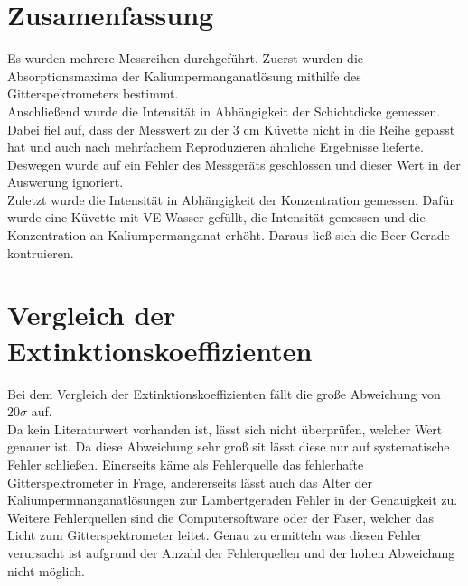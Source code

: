 
\section{Zusamenfassung}

Es wurden mehrere Messreihen durchgeführt. Zuerst wurden die
Absorptionsmaxima der Kaliumpermanganatlösung mithilfe des Gitterspektrometers bestimmt.\\
Anschließend wurde die Intensität in Abhängigkeit der Schichtdicke gemessen. Dabei fiel auf,
dass der Messwert zu der 3 cm Küvette nicht in die Reihe gepasst hat und auch nach mehrfachem
Reproduzieren ähnliche Ergebnisse lieferte. Deswegen wurde auf ein Fehler des Messgeräts geschlossen
und dieser Wert in der Auswerung ignoriert.\\ 
Zuletzt wurde die Intensität in Abhängigkeit der Konzentration gemessen. Dafür wurde eine Küvette
mit VE Wasser gefüllt, die Intensität gemessen und die Konzentration an Kaliumpermanganat erhöht.
Daraus ließ sich die Beer Gerade kontruieren.

\section{Vergleich der Extinktionskoeffizienten}

Bei dem Vergleich der Extinktionskoeffizienten fällt die große Abweichung von
$20 \sigma$ auf. \\
Da kein Literaturwert vorhanden ist, lässt sich nicht überprüfen, welcher Wert
genauer ist. Da diese Abweichung sehr groß sit lässt diese nur auf systematische
Fehler schließen. Einerseits käme als Fehlerquelle das fehlerhafte Gitterspektrometer in Frage,
andererseits lässt auch das Alter der Kaliumpermnanganatlösungen zur Lambertgeraden
Fehler in der Genauigkeit zu. Weitere Fehlerquellen sind die Computersoftware oder der Faser, welcher das Licht zum Gitterspektrometer leitet. Genau zu ermitteln was diesen Fehler verursacht ist aufgrund 
der Anzahl der Fehlerquellen und der hohen Abweichung nicht möglich.
